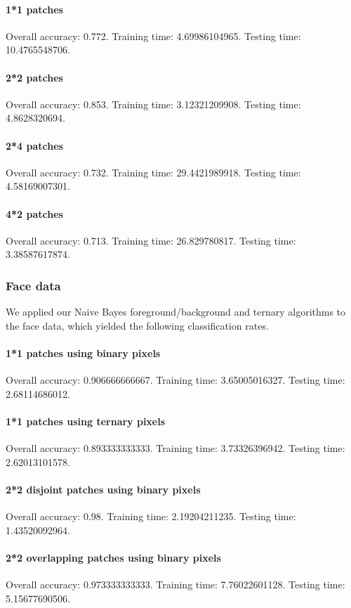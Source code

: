 \paragraph{1*1 patches} Overall accuracy: 0.772. Training time: 4.69986104965. Testing time: 10.4765548706.
\paragraph{2*2 patches} Overall accuracy: 0.853. Training time: 3.12321209908. Testing time: 4.8628320694.
\paragraph{2*4 patches} Overall accuracy: 0.732. Training time: 29.4421989918. Testing time: 4.58169007301.
\paragraph{4*2 patches} Overall accuracy: 0.713. Training time: 26.829780817. Testing time: 3.38587617874.

\subsubsection{Face data}
We applied our Naive Bayes foreground/background and ternary algorithms to the face data, which yielded the following classification rates.
\paragraph{1*1 patches using binary pixels} Overall accuracy: 0.906666666667. Training time: 3.65005016327. Testing time: 2.68114686012.
\paragraph{1*1 patches using ternary pixels} Overall accuracy: 0.893333333333. Training time: 3.73326396942. Testing time: 2.62013101578.
\paragraph{2*2 disjoint patches using binary pixels} Overall accuracy: 0.98. Training time: 2.19204211235. Testing time: 1.43520092964.
\paragraph{2*2 overlapping patches using binary pixels} Overall accuracy: 0.973333333333. Training time: 7.76022601128. Testing time: 5.15677690506.
